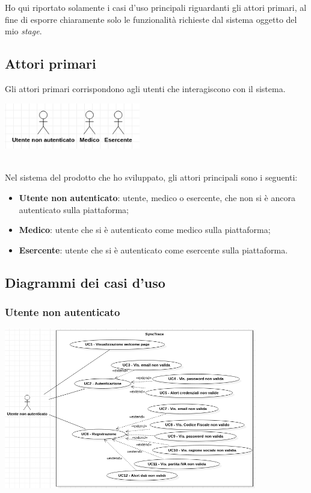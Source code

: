 Ho qui riportato solamente i casi d'uso principali riguardanti gli attori primari, al fine di esporre chiaramente solo le funzionalità richieste dal sistema oggetto del mio \textit{stage}.

\subsection*{Attori primari}

Gli attori primari corrispondono agli utenti che interagiscono con il sistema.

\begin{minipage}{\linewidth}
  \centering
    \includegraphics[height=2cm]{immagini/uc/attori}
\end{minipage} \\

Nel sistema del prodotto che ho sviluppato, gli attori principali sono i seguenti:
\begin{itemize}
  \item \textbf{Utente non autenticato}: utente, medico o esercente, che non si è ancora autenticato sulla piattaforma;
  \item \textbf{Medico}: utente che si è autenticato come medico sulla piattaforma;
  \item \textbf{Esercente}: utente che si è autenticato come esercente sulla piattaforma.
\end{itemize}

\subsection*{Diagrammi dei casi d'uso}

\subsubsection*{Utente non autenticato}

\begin{minipage}{\linewidth}
  \centering
    \includegraphics[height=7cm]{immagini/uc/nonautenticato}
\end{minipage} \\

